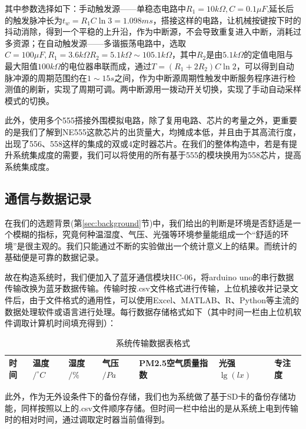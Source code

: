 \documentclass[a4paper, 11pt]{article} %
\begin{document}
其中参数选择如下：手动触发源——单稳态电路中$ R_1 = 10k\Omega, C = 0.1\mu F$,延长后的触发脉冲长为$t_w = R_1C\ln 3 = 1.098ms$，搭接这样的电路，让机械按键按下时的抖动消除，得到一个平稳的上升沿，作为中断源，不会导致重复进入中断，消耗过多资源；在自动触发源——多谐振荡电路中，选取$C = 100\mu F, R_1 = 3.6k\Omega R_2 = 5.1k\Omega \sim 105.1k\Omega$，其中$R_2$是由$5.1k\Omega$的定值电阻与最大阻值$100k\Omega$的电位器串联而成，通过$T = (R_1 + 2R_2)C \ln 2$，可以得到自动脉冲源的周期范围约在$1 \sim 15 s$之间，作为中断源周期性触发中断服务程序进行检测值的刷新，实现了周期可调。两中断源用一拨动开关切换，实现了手动自动采样模式的切换。

此外，使用多个555搭接外围模拟电路，除了复用电路、芯片的考量之外，更重要的是我们了解到NE555这款芯片的出货量大，均摊成本低，并且由于其高流行度，出现了556、558这样的集成的双或4定时器芯片\cite{555}\cite{556}\cite{558}。在我们的整体构造中，若是有提升系统集成度的需要，我们可以将使用的所有基于555的模块换用为558芯片，提高系统集成度。

\subsection{通信与数据记录}

在我们的选题背景(第\ref{sec:background}节)中，我们给出的判断是环境是否舒适是一个模糊的指标，究竟何种温湿度、气压、光强等环境参量能组成一个“舒适的环境”是很主观的。我们只能通过不断的实验做出一个统计意义上的结果。而统计的基础便是可靠的数据记录。

故在构造系统时，我们便加入了蓝牙通信模块HC-06，将arduino uno的串行数据传输改换为蓝牙数据传输。传输时按.csv文件格式进行传输，上位机接收并记录文件后，由于文件格式的通用性，可以使用Excel、MATLAB、R、Python等主流的数据处理软件或语言进行处理。每行数据存储格式如下（其中时间一栏由上位机软件调取计算机时间填充得到）：

\begin{table}[H]
  \centering
  \begin{tabular}{|l|l|l|l|l|l|l|}
  \hline
  时间 & 温度$/^\circ C$ & 湿度$/\%$ & 气压$/Pa$ & PM2.5空气质量指数 & 光强$\lg(lx)$ & 专注度 \\
  \hline
  \end{tabular}
  \caption{系统传输数据表格式}
\end{table}

此外，作为无外设条件下的备份存储，我们也为系统做了基于SD卡的备份存储功能，同样按照以上的.csv文件顺序存储。但时间一栏中给出的是从系统上电到传输时的相对时间，通过调取定时器当前值得到。
\end{document}
